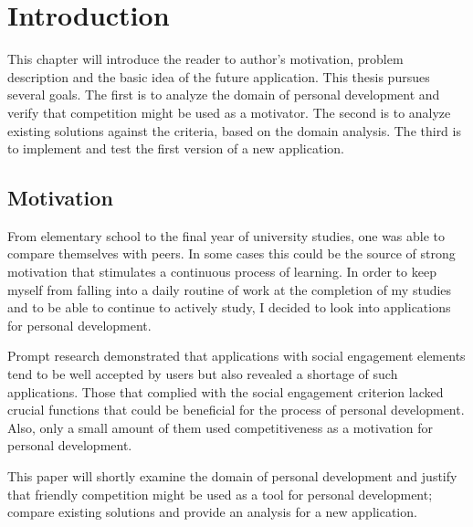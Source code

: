 

\chapter{Introduction}\label{ch:introduction}

This chapter will introduce the reader to author's motivation, problem description and the basic idea of the future application.
This thesis pursues several goals.
The first is to analyze the domain of personal development and verify that competition might be used as a motivator.
The second is to analyze existing solutions against the criteria, based on the domain analysis.
The third is to implement and test the first version of a new application.

\section{Motivation}\label{sec:introduction-motivation}

From elementary school to the final year of university studies, one was able to compare themselves with peers.
In some cases this could be the source of strong motivation that stimulates a continuous process of learning.
In order to keep myself from falling into a daily routine of work at the completion of my studies and to be able to continue to actively study, I decided to look
into applications for personal development.

Prompt research demonstrated that applications with social engagement elements tend to be well accepted by users
but also revealed a shortage of such applications.
Those that complied with the social engagement criterion lacked crucial functions that could be beneficial for the process of personal development.
Also, only a small amount of them used competitiveness as a motivation for personal development.

This paper will shortly examine the domain of personal development and justify that friendly competition might be used as a tool for personal development;
compare existing solutions and provide an analysis for a new application.


